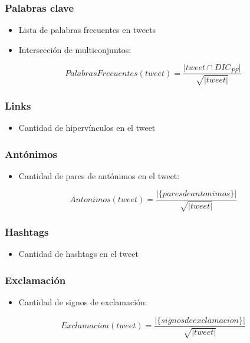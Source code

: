 \begin{frame}
    \frametitle{Palabras clave}

    \begin{itemize}
        \item Lista de palabras frecuentes en tweets
        \item Intersección de multiconjuntos:
    \end{itemize}

    \begin{center}
        \[
            PalabrasFrecuentes(tweet) = \frac{|tweet \cap DIC_{PF}|}{\sqrt{|tweet|}}
        \]
    \end{center}
\end{frame}

\begin{frame}
    \frametitle{Links}

    \begin{itemize}
        \item Cantidad de hipervínculos en el tweet
    \end{itemize}
\end{frame}

\begin{frame}
    \frametitle{Antónimos}

    \begin{itemize}
        \item Cantidad de pares de antónimos en el tweet:
    \end{itemize}

    \begin{center}
        \[
            Antonimos(tweet) = \frac{|\{pares de antonimos\}|}{\sqrt{|tweet|}}
        \]
    \end{center}
\end{frame}

\begin{frame}
    \frametitle{Hashtags}

    \begin{itemize}
        \item Cantidad de hashtags en el tweet
    \end{itemize}
\end{frame}

\begin{frame}
    \frametitle{Exclamación}

    \begin{itemize}
        \item Cantidad de signos de exclamación:
    \end{itemize}

    \begin{center}
        \[
            Exclamacion(tweet) = \frac{|\{signos de exclamacion\}|}{\sqrt{|tweet|}}
        \]
    \end{center}
\end{frame}

